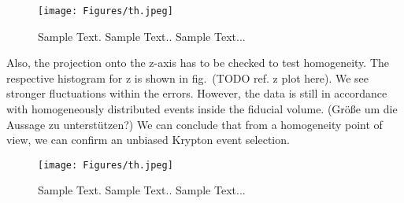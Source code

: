 \begin{figure}
\centering
\texttt{[image: Figures/th.jpeg]}  %
\caption[Kr r-histogram Homogeneity]{
        Sample Text.
        Sample Text..
        Sample Text...
    }
\label{fig:r-hist-homogen}
\end{figure}

Also, the projection onto the z-axis has to be checked to test homogeneity.
The respective histogram for z is shown in fig.~(TODO ref. z plot here).
We see stronger fluctuations within the errors.
However, the data is still in accordance with homogeneously distributed events inside the fiducial volume.
(Größe um die Aussage zu unterstützen?)
We can conclude that from a homogeneity point of view, we can confirm an unbiased Krypton event selection.

\begin{figure}
\centering
\texttt{[image: Figures/th.jpeg]}  %
\caption[Kr z-histogram Homogeneity]{
        Sample Text.
        Sample Text..
        Sample Text...
    }
\label{fig:z-hist-homogen}
\end{figure}



